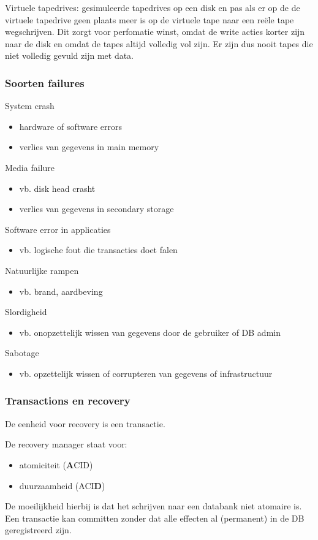 \documentclass[a4paper,12pt]{article}
\begin{document}
Virtuele tapedrives: gesimuleerde tapedrives op een disk en pas als er op de de virtuele tapedrive geen plaats meer is op de virtuele tape naar een reële tape wegschrijven.
Dit zorgt voor perfomatie winst, omdat de write acties korter zijn naar de disk en omdat de tapes altijd volledig vol zijn.
Er zijn dus nooit tapes die niet volledig gevuld zijn met data.

\subsubsection{Soorten failures}
System crash
\begin{itemize}
\item hardware of software errors
\item verlies van gegevens in main memory
\end{itemize}
Media failure
\begin{itemize}
\item vb. disk head crasht
\item verlies van gegevens in secondary storage
\end{itemize}
Software error in applicaties
\begin{itemize}
\item vb. logische fout die transacties doet falen
\end{itemize}
Natuurlijke rampen
\begin{itemize}
\item vb. brand, aardbeving
\end{itemize}
Slordigheid
\begin{itemize}
\item vb. onopzettelijk wissen van gegevens door de gebruiker of DB admin
\end{itemize}
Sabotage
\begin{itemize}
\item vb. opzettelijk wissen of corrupteren van gegevens of infrastructuur
\end{itemize}

\subsubsection{Transactions en recovery}
De eenheid voor recovery is een transactie.

De recovery manager staat voor:
\begin{itemize}
\item atomiciteit (\textbf{A}CID)
\item duurzaamheid (ACI\textbf{D})
\end{itemize}
De moeilijkheid hierbij is dat het schrijven naar een databank niet atomaire is.
Een transactie kan committen zonder dat alle effecten al (permanent) in de DB geregistreerd zijn.
\end{document}
